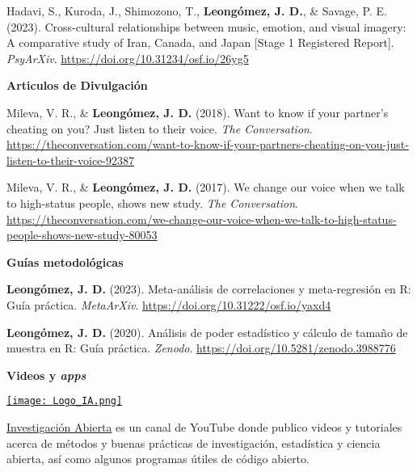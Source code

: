 \documentclass[11pt,a4paper,]{awesome-cv}
\begin{document}
Hadavi, S., Kuroda, J., Shimozono, T., \textbf{Leongómez, J. D.}, \&
Savage, P. E. (2023). Cross-cultural relationships between music,
emotion, and visual imagery: A comparative study of Iran, Canada, and
Japan {[}Stage 1 Registered Report{]}. \emph{PsyArXiv}.
\url{https://doi.org/10.31234/osf.io/26yg5}

\endgroup

\blacktriangleright\blacktriangleright\blacktriangleright\space \textbf{Articulos de Divulgación}

\begingroup
\footnotesize
\setlength{\parindent}{-0.5in}
\setlength{\leftskip}{0.5in}

Mileva, V. R., \& \textbf{Leongómez, J. D.} (2018). Want to know if your
partner's cheating on you? Just listen to their voice. \emph{The
Conversation}.
\url{https://theconversation.com/want-to-know-if-your-partners-cheating-on-you-just-listen-to-their-voice-92387}

Mileva, V. R., \& \textbf{Leongómez, J. D.} (2017). We change our voice
when we talk to high-status people, shows new study. \emph{The
Conversation}.
\url{https://theconversation.com/we-change-our-voice-when-we-talk-to-high-status-people-shows-new-study-80053}

\endgroup

\blacktriangleright\blacktriangleright\blacktriangleright\space \textbf{Guías metodológicas}

\begingroup
\footnotesize
\setlength{\parindent}{-0.5in}
\setlength{\leftskip}{0.5in}

\textbf{Leongómez, J. D.} (2023). Meta-análisis de correlaciones y
meta-regresión en R: Guía práctica. \emph{MetaArXiv}.
\url{https://doi.org/10.31222/osf.io/yaxd4}

\textbf{Leongómez, J. D.} (2020). Análisis de poder estadístico y
cálculo de tamaño de muestra en R: Guía práctica. \emph{Zenodo}.
\url{https://doi.org/10.5281/zenodo.3988776}

\endgroup

\blacktriangleright\blacktriangleright\blacktriangleright\space \textbf{Videos y \textit{apps}}

\begin{minipage}[c]{0.10\linewidth}
\href{https://www.youtube.com/@InvestigacionAbierta}{\texttt{[image: Logo\_IA.png]}}
\end{minipage} \begin{minipage}[c]{0.90\linewidth} \begin{footnotesize}
\textcolor{red}{\faYoutube} \href{https://www.youtube.com/@InvestigacionAbierta}{Investigación Abierta} es un canal de YouTube donde publico videos y tutoriales acerca de métodos y buenas prácticas de investigación, estadística y ciencia abierta, así como algunos programas útiles de código abierto.
\end{footnotesize}
\end{minipage}
\end{document}
